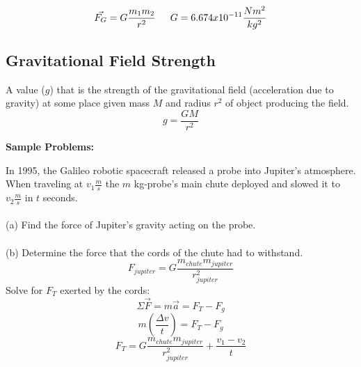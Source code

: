 \documentclass{article}
\begin{document}
\[
\vec{F_G}=G\frac{m_1m_2}{r^2} \indent
G=6.674x10^{-11}\frac{Nm^2}{kg^2}
\]

\subsection{Gravitational Field Strength}
A value ($g$) that is the strength of the gravitational field (acceleration due to gravity) at some place given mass $M$ and radius $r^2$ of object producing the field.
\[
g=\frac{GM}{r^2}
\]

\noindent\textbf{Sample Problems:}

\begin{multicols}{2}
  In 1995, the Galileo robotic spacecraft released a probe into Jupiter’s atmosphere.  When traveling at $v_1 \frac{m}{s}$ the $m$ kg-probe’s main chute deployed and slowed it to $v_2 \frac{m}{s}$ in $t$ seconds.\\\\ (a) Find the force of Jupiter’s gravity acting on the probe.\\\\ (b) Determine the force that the cords of the chute had to withstand.
  \columnbreak
  \vfill
  \[
  F_{jupiter}=G\frac{m_{chute}m_{jupiter}}{r_{jupiter}^2}
  \]
  Solve for $F_T$ exerted by the cords:
  \[
  \Sigma\vec{F}=m\vec{a}=F_T-F_g
  \]
  \[
  m(\frac{\Delta v}{t})=F_T-F_g
  \]
  \[
  F_T=G\frac{m_{chute}m_{jupiter}}{r_{jupiter}^2}+\frac{v_1-v_2}{t}
  \]
\end{multicols}

\noindent{\centerline{\rule{5cm}{0.4pt}}}
\end{document}
